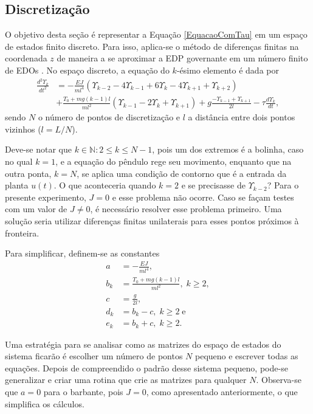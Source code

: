 \subsection{Discretização}
O objetivo desta seção é representar a Equação \ref{EquacaoComTau} em um espaço de estados finito discreto.  Para isso, aplica-se o método de diferenças finitas na coordenada $z$ de maneira a se aproximar a EDP governante em um número finito de EDOs \cite{fabricioIFAC}. No espaço discreto, a equação do $k$-ésimo elemento é dada por \begin{align}
	\frac{d^2\Upsilon_k}{dt^2} &= -\frac{EJ}{m l^4}\left(\Upsilon_{k-2} - 4\Upsilon_{k-1}+6\Upsilon_{k}-4\Upsilon_{k+1}+\Upsilon_{k+2}\right)\nonumber\\
	&+ \frac{T_0+mg(k-1)l}{m l^2}\left(\Upsilon_{k-1}-2\Upsilon_{k} + \Upsilon_{k+1}\right)+g\frac{-\Upsilon_{k-1}+\Upsilon_{k+1}}{2l}-\tau\frac{d\Upsilon_k}{dt},
\end{align} sendo $N$ o número de pontos de discretização e $l$ a distância entre dois pontos vizinhos ($l = L/N$).

 Deve-se notar que $k\in \mathbb{N}:2\le k \le N-1$, pois um dos extremos é a bolinha, caso no qual $k=1$, e a equação do pêndulo rege seu movimento, enquanto que na outra ponta, $k=N$, se aplica uma condição de contorno que é a entrada da planta $u(t)$. O que aconteceria quando $k=2$ e se precisasse de $\Upsilon_{k-2}$? Para o presente experimento, $J=0$ e esse problema não ocorre. Caso se façam testes com um valor de $J\neq 0$, é necessário resolver esse problema primeiro. Uma solução seria utilizar diferenças finitas unilaterais para esses pontos próximos à fronteira.

 Para simplificar, definem-se as constantes \begin{align}
	a &= -\frac{EJ}{m l^4},\\
	b_k &= \frac{T_0 + mg(k-1)l}{m l^2},\; k\ge 2,\\
	c &= \frac{g}{2l},\\
	d_k &= b_k - c,\; k\ge 2\;\mathrm{e}\\
	e_k &= b_k + c,\; k\ge 2.
\end{align}

 Uma estratégia para se analisar como as matrizes do espaço de estados do sistema ficarão é escolher um número de pontos $N$ pequeno e escrever todas as equações. Depois de compreendido o padrão desse sistema pequeno, pode-se generalizar e criar uma rotina que crie as matrizes para qualquer $N$. Observa-se que $a=0$ para o barbante, pois $J=0$, como apresentado anteriormente, o que simplifica os cálculos.


